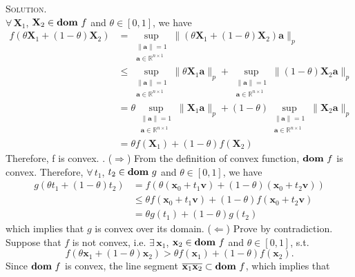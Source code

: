 \documentclass[12pt, a4paper, oneside]{ctexart}
\newenvironment{solution}{\par\noindent\textsc{Solution. }}{\\\par}
\DeclareMathOperator*{\dom}{\bf dom\,}
\begin{document}
\begin{solution}
\[    \]
    $\forall\, \mathbf{X}_1$, $\mathbf{X}_2 \in \dom f$ and $\theta \in [0, 1]$, we have
    \begin{align*}
        f(\theta \mathbf{X}_1 + (1 - \theta) \mathbf{X}_2) & = \sup_{\substack{\|\mathbf{a}\| = 1 \\ \mathbf{a} \in \mathbb{R}^{n \times 1}}} \|(\theta \mathbf{X}_1 + (1 - \theta) \mathbf{X}_2)\mathbf{a}\|_p \\
        & \leq \sup_{\substack{\|\mathbf{a}\| = 1 \\ \mathbf{a} \in \mathbb{R}^{n \times 1}}} \|\theta \mathbf{X}_1 \mathbf{a}\|_p + \sup_{\substack{\|\mathbf{a}\| = 1 \\ \mathbf{a} \in \mathbb{R}^{n \times 1}}} \|(1 - \theta) \mathbf{X}_2 \mathbf{a}\|_p \\
        & = \theta \sup_{\substack{\|\mathbf{a}\| = 1 \\ \mathbf{a} \in \mathbb{R}^{n \times 1}}} \|\mathbf{X}_1 \mathbf{a}\|_p + (1 - \theta) \sup_{\substack{\|\mathbf{a}\| = 1 \\ \mathbf{a} \in \mathbb{R}^{n \times 1}}} \|\mathbf{X}_2 \mathbf{a}\|_p \\
        & = \theta f(\mathbf{X}_1) + (1 - \theta) f(\mathbf{X}_2)
    \end{align*}
    Therefore, f is convex.
    \newline{}. ($\Rightarrow$) From the definition of convex function, $\dom f$ is convex. Therefore, $\forall\, t_1$, $t_2 \in \dom g$ and $\theta \in [0, 1]$, we have
    \begin{align*}
    	g(\theta t_1 + (1 - \theta) t_2) & = f(\theta (\mathbf{x}_0 + t_1 \mathbf{v}) + (1 - \theta) (\mathbf{x}_0 + t_2 \mathbf{v})) \\
    	& \leq \theta f(\mathbf{x}_0 + t_1 \mathbf{v}) + (1 - \theta) f(\mathbf{x}_0 + t_2 \mathbf{v}) \\
    	& = \theta g(t_1) + (1 - \theta) g(t_2)
    \end{align*}
    which implies that $g$ is convex over its domain. \newline
    ($\Leftarrow$) Prove by contradiction. Suppose that $f$ is not convex, i.e. $\exists\, \mathbf{x}_1$, $\mathbf{x}_2 \in \dom f$ and $\theta \in [0, 1]$, s.t.
    \[
    f(\theta \mathbf{x}_1 + (1 - \theta) \mathbf{x}_2) > \theta f(\mathbf{x}_1) + (1 - \theta) f(\mathbf{x}_2).
    \]
    Since $\dom f$ is convex, the line segment $\overline{\mathbf{x}_1\mathbf{x}_2} \subset \dom f$, which implies that

\end{solution}
\end{document}
